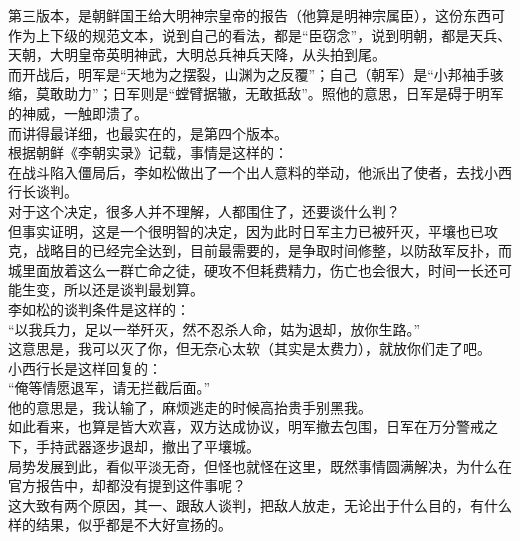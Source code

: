 \begin{multicols}{\theparacolNo}
第三版本，是朝鲜国王给大明神宗皇帝的报告（他算是明神宗属臣），这份东西可作为上下级的规范文本，说到自己的看法，都是“臣窃念”，说到明朝，都是天兵、天朝，大明皇帝英明神武，大明总兵神兵天降，从头拍到尾。\\

而开战后，明军是“天地为之摆裂，山渊为之反覆”；自己（朝军）是“小邦袖手骇缩，莫敢助力”；日军则是“螳臂据辙，无敢抵敌”。照他的意思，日军是碍于明军的神威，一触即溃了。\\

而讲得最详细，也最实在的，是第四个版本。\\

根据朝鲜《李朝实录》记载，事情是这样的：\\

在战斗陷入僵局后，李如松做出了一个出人意料的举动，他派出了使者，去找小西行长谈判。\\

对于这个决定，很多人并不理解，人都围住了，还要谈什么判？\\

但事实证明，这是一个很明智的决定，因为此时日军主力已被歼灭，平壤也已攻克，战略目的已经完全达到，目前最需要的，是争取时间修整，以防敌军反扑，而城里面放着这么一群亡命之徒，硬攻不但耗费精力，伤亡也会很大，时间一长还可能生变，所以还是谈判最划算。\\

李如松的谈判条件是这样的：\\

“以我兵力，足以一举歼灭，然不忍杀人命，姑为退却，放你生路。”\\

这意思是，我可以灭了你，但无奈心太软（其实是太费力），就放你们走了吧。\\

小西行长是这样回复的：\\

“俺等情愿退军，请无拦截后面。”\\

他的意思是，我认输了，麻烦逃走的时候高抬贵手别黑我。\\

如此看来，也算是皆大欢喜，双方达成协议，明军撤去包围，日军在万分警戒之下，手持武器逐步退却，撤出了平壤城。\\

局势发展到此，看似平淡无奇，但怪也就怪在这里，既然事情圆满解决，为什么在官方报告中，却都没有提到这件事呢？\\

这大致有两个原因，其一、跟敌人谈判，把敌人放走，无论出于什么目的，有什么样的结果，似乎都是不大好宣扬的。\\


\end{multicols}
